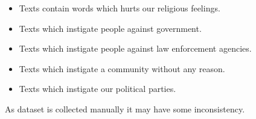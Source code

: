 \documentclass[12pt,a4paper]{report}
\begin{document}
\begin{itemize}
    \item Texts contain words which hurts our religious              feelings.
    \item Texts which instigate people against government.
    \item Texts which instigate people against law enforcement        agencies.
    \item Texts which instigate a community without any reason.
    \item Texts which instigate our political parties. 
    
\end{itemize}
As dataset is collected manually it may have some inconsistency.
\end{document}
